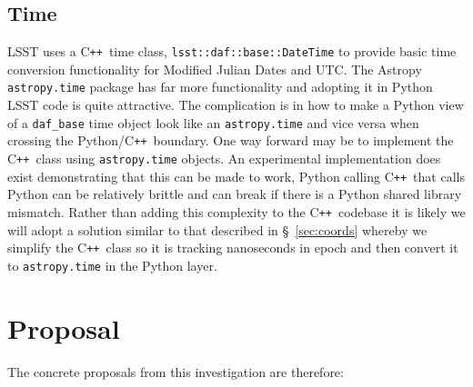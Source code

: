 \documentclass[]{spie}  %
\newcommand{\CPP}{C\texttt{++}\xspace}  %
\begin{document}
\subsection{Time}

LSST uses a \CPP\ time class, \texttt{lsst::daf::base::DateTime} to provide basic time conversion functionality for Modified Julian Dates and UTC.
The Astropy \texttt{astropy.time} package has far more functionality and adopting it in Python LSST code is quite attractive.
The complication is in how to make a Python view of a \texttt{daf\_base} time object look like an \texttt{astropy.time} and vice versa when crossing the Python/\CPP\ boundary.
One way forward may be to implement the \CPP\ class using \texttt{astropy.time} objects.
An experimental implementation does exist demonstrating that this can be made to work, Python calling \CPP\ that calls Python can be relatively brittle and can break if there is a Python shared library mismatch.
Rather than adding this complexity to the \CPP\ codebase it is likely we will adopt a solution similar to that described in \S~\ref{sec:coords} whereby we simplify the \CPP\ class so it is tracking nanoseconds in epoch and then convert it to \texttt{astropy.time} in the Python layer.

\section{Proposal}

The concrete proposals from this investigation are therefore:
\end{document}
